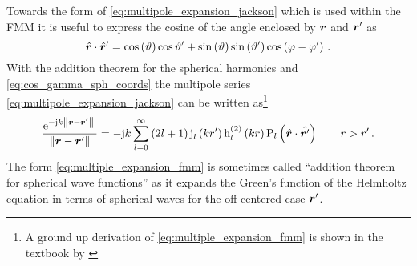 Towards the form of \eqref{eq:multipole_expansion_jackson} which is used within
the \ac{FMM} it is useful to express the cosine of the angle enclosed by
$\robs$ and $\rsrc$ as
\begin{equation}\label{eq:cos_gamma_sph_coords}
	\uv{r} \cdot \uv{r}^\prime =
	\cos \left(\vartheta\right) \cos \vartheta^\prime +
	\sin \left(\vartheta\right) \sin \left(\vartheta^\prime\right)
	\cos \left(\varphi - \varphi^\prime\right)
	\, .
\end{equation}
With the addition theorem for the spherical harmonics
\cite[(14.30.9)]{Olver2010} and \eqref{eq:cos_gamma_sph_coords} the multipole
series \eqref{eq:multipole_expansion_jackson} can be written
as\footnote{A ground up derivation of \eqref{eq:multiple_expansion_fmm} is
shown in the textbook by \textcite[414]{Stratton2007}}
\begin{equation}\label{eq:multiple_expansion_fmm}
	\frac{\exp{-\im k \rdiffNorm}}{\rdiffNorm} =
	-\im k \sum\limits_{l=0}^{\infty}
	\left(2l + 1\right)
	\sphbesselj{l}    \left( k r^\prime \right)
	\sphbesselh{2}{l} \left( k r        \right)
	\legendrepl{l} \left( \uv{r} \cdot \uv{r^\prime} \right)
	\qquad
	r > r^\prime
	\, .
\end{equation}
The form \eqref{eq:multiple_expansion_fmm} is sometimes called \enquote{addition
theorem for spherical wave functions} \cite[362]{Jin2015} as it expands the
Green's function of the Helmholtz equation in terms of spherical waves for the
off-centered case $\rsrc$.

